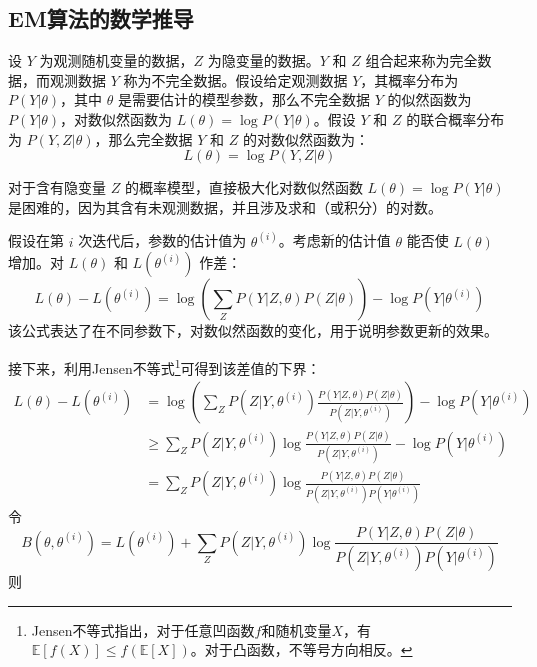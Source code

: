 \documentclass[a4paper,12pt]{ctexart} %
\begin{document}
\subsection{EM算法的数学推导}
设 \( Y \) 为观测随机变量的数据，\( Z \) 为隐变量的数据。\( Y \) 和 \( Z \) 组合起来称为完全数据，而观测数据 \( Y \) 称为不完全数据。假设给定观测数据 \( Y \)，其概率分布为 \( P(Y|\theta) \)，其中 \( \theta \) 是需要估计的模型参数，那么不完全数据 \( Y \) 的似然函数为 \( P(Y|\theta) \)，对数似然函数为 \( L(\theta) = \log P(Y|\theta) \)。假设 \( Y \) 和 \( Z \) 的联合概率分布为 \( P(Y, Z|\theta) \)，那么完全数据 \( Y \) 和 \( Z \) 的对数似然函数为：
\begin{equation}
L(\theta) = \log P(Y, Z|\theta)
\end{equation}

对于含有隐变量 \( Z \) 的概率模型，直接极大化对数似然函数 \( L(\theta) = \log P(Y|\theta) \) 是困难的，因为其含有未观测数据，并且涉及求和（或积分）的对数。

假设在第 \( i \) 次迭代后，参数的估计值为 \( \theta^{(i)} \)。考虑新的估计值 \( \theta \) 能否使 \( L(\theta) \) 增加。对 \( L(\theta) \) 和 \( L(\theta^{(i)}) \) 作差：
\begin{equation}
L(\theta) - L(\theta^{(i)}) = \log \left( \sum_{Z} P(Y|Z, \theta)P(Z|\theta) \right) - \log P(Y|\theta^{(i)})
\end{equation}
该公式表达了在不同参数下，对数似然函数的变化，用于说明参数更新的效果。

接下来，利用Jensen不等式\footnote{Jensen不等式指出，对于任意凹函数$f$和随机变量$X$，有$\mathbb{E}[f(X)] \leq f(\mathbb{E}[X])$。对于凸函数，不等号方向相反。}可得到该差值的下界：
\begin{equation}
    \begin{split}
        L(\theta) - L(\theta^{(i)}) &= \log \left( \sum_{Z} P(Z|Y, \theta^{(i)}) \frac{P(Y|Z, \theta)P(Z|\theta)}{P(Z|Y, \theta^{(i)})} \right) - \log P(Y|\theta^{(i)}) \\
&\geq \sum_{Z} P(Z|Y, \theta^{(i)}) \log \frac{P(Y|Z, \theta)P(Z|\theta)}{P(Z|Y, \theta^{(i)})} - \log P(Y|\theta^{(i)}) \\
&= \sum_{Z} P(Z|Y,\theta^{(i)}) \log \frac{P(Y|Z,\theta)P(Z|\theta)}{P(Z|Y,\theta^{(i)})P(Y|\theta^{(i)})}
    \end{split}
\end{equation}
令
\begin{equation}
    B(\theta,\theta^{(i)}) = L(\theta^{(i)}) + \sum_{Z} P(Z|Y,\theta^{(i)}) \log \dfrac{P(Y|Z,\theta)P(Z|\theta)}{P(Z|Y,\theta^{(i)})P(Y|\theta^{(i)})} 
    \label{eq1}
\end{equation}
则
\end{document}
